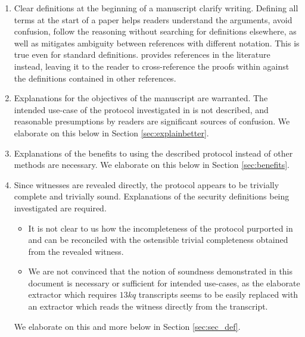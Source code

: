 \documentclass{article}
\theoremstyle{definition}
\newcommand{\6}{\mathbf}
\newcommand{\7}{\mathcal}
\newcommand{\brando}[1]{{\textcolor{green}{#1}}}
\begin{document}
\begin{enumerate}
    \item Clear definitions at the beginning of a manuscript clarify writing. Defining all terms at the start of a paper helps readers understand the arguments, avoid confusion, follow the reasoning without searching for definitions elsewhere, as well as mitigates ambiguity between references with different notation.  This is true even for standard definitions. \cite{BassaSoundnessIPDL} provides references in the literature instead, leaving it to the reader to cross-reference the proofs within against the definitions contained in other references.

    \item Explanations for the objectives of the manuscript are warranted. The intended use-case of the protocol investigated in \cite{BassaSoundnessIPDL} is not described, and reasonable presumptions by readers are significant sources of confusion. We elaborate on this below in Section \ref{sec:explainbetter}.
    

    \item Explanations of the benefits to using the described protocol instead of other methods are necessary. We elaborate on this below in Section \ref{sec:benefits}.

    \item Since witnesses are revealed directly, the protocol appears to be trivially complete and trivially sound. Explanations of the security definitions being investigated are required.
    \begin{itemize}
    \item It is not clear to us how the incompleteness of the protocol purported in \cite{BassaSoundnessIPDL} and \cite{Eagen22} can be reconciled with the ostensible trivial completeness obtained from the revealed witness. 

    \item We are not convinced that the notion of soundness demonstrated in this document is necessary or sufficient for intended use-cases, as the elaborate extractor which requires $13kq$ transcripts seems to be easily replaced with an extractor which reads the witness directly from the transcript. 
    \end{itemize} 
     We elaborate on this and more below in Section \ref{sec:sec_def}.



\end{enumerate}
\end{document}
